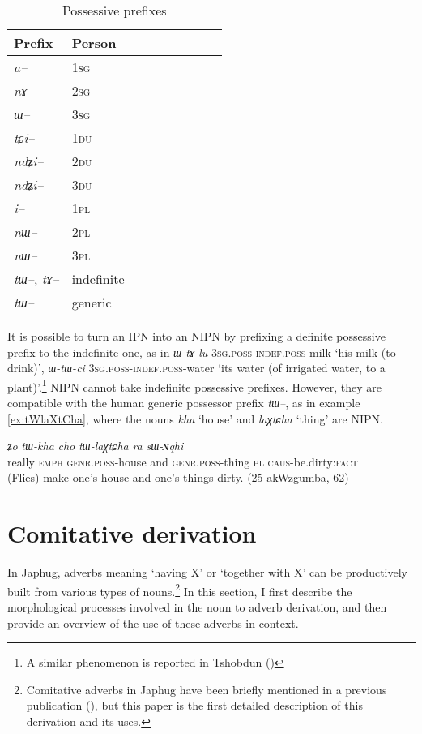 \documentclass[oldfontcommands,oneside,a4paper,11pt]{article}
\newcommand{\ipa}[1]{{\phon\textit{#1}}} %
\begin{document}
\begin{table}[h] \centering
\caption{Possessive prefixes }\label{tab:possessive}
\begin{tabular}{lllllllll} 
\toprule
 Prefix & Person\\
\midrule
\ipa{a--}  & 1\textsc{sg} \\
\ipa{nɤ--}  & 2\textsc{sg}\\
\ipa{ɯ--}  & 3\textsc{sg}\\
\midrule
\ipa{tɕi--}  &  1\textsc{du} \\
\ipa{ndʑi--}  & 2\textsc{du} \\	
\ipa{ndʑi--}  & 3\textsc{du} \\	
\midrule
\ipa{i--}  & 1\textsc{pl} \\
\ipa{nɯ--}  & 2\textsc{pl} \\
\ipa{nɯ--}  & 3\textsc{pl} \\
\midrule
\ipa{tɯ--},  \ipa{tɤ--} & indefinite \\
\ipa{tɯ--}   &  generic \\
\bottomrule
\end{tabular}
\end{table}

It is possible to turn an IPN into an NIPN by prefixing a definite possessive prefix to the indefinite one, as in \ipa{ɯ-tɤ-lu} \textsc{3sg.poss-indef.poss}-milk `his milk (to drink)', \ipa{ɯ-tɯ-ci} \textsc{3sg.poss-indef.poss}-water `its water (of irrigated water, to a plant)'.\footnote{A similar phenomenon is reported in Tshobdun (\citealt[140]{jackson98morphology})} NIPN cannot take indefinite possessive prefixes. However, they are compatible with the human generic possessor prefix \ipa{tɯ--}, as in example \ref{ex:tWlaXtCha}, where the nouns \ipa{kha} `house' and \ipa{laχtɕha} `thing' are NIPN.

\begin{exe}
\ex \label{ex:tWlaXtCha}
\gll  \ipa{wuma}  	\ipa{ʑo}  	\ipa{tɯ-kha}  	\ipa{cho}  	\ipa{tɯ-laχtɕha}  	\ipa{ra}  	\ipa{sɯ-ɴqhi}  \\
really \textsc{emph} \textsc{genr.poss}-house and \textsc{genr.poss}-thing \textsc{pl} \textsc{caus}-be.dirty:\textsc{fact} \\
\glt (Flies) make one's house and one's things dirty. (25 akWzgumba, 62)
\end{exe}


 
 \section{Comitative derivation} 
In Japhug, adverbs meaning `having X' or `together with X' can be productively built from various types of nouns.\footnote{Comitative adverbs in Japhug have been briefly mentioned in a previous publication (\citealt[51]{jacques08}), but this paper is the first detailed description of this derivation and its uses.} In this section, I first describe the morphological processes involved in the noun to adverb derivation, and then provide an overview of the use of these adverbs in context.
\end{document}
